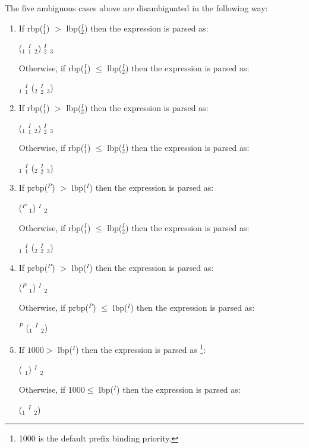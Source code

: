The five ambiguous cases above are disambiguated in the following way:

\begin{enumerate}

\item If rbp({\funsym}$^I_1$) $>$ lbp({\funsym}$^I_2$)
then the expression is parsed as:

({\term}$_1$ {\funsym}$^I_1$ {\term}$_2$) {\funsym}$^I_2$ {\term}$_3$

Otherwise, if
rbp({\funsym}$^I_1$) $\leq$ lbp({\funsym}$^I_2$)
then the expression is parsed as:

{\term}$_1$ {\funsym}$^I_1$ ({\term}$_2$ {\funsym}$^I_2$ {\term}$_3$)

\item If rbp({\sentconn}$^I_1$) $>$ lbp({\sentconn}$^I_2$)
then the expression is parsed as:

({\wff}$_1$ {\sentconn}$^I_1$ {\wff}$_2$) {\sentconn}$^I_2$ {\wff}$_3$

Otherwise, if
rbp({\sentconn}$^I_1$) $\leq$ lbp({\sentconn}$^I_2$)
then the expression is parsed as:

{\wff}$_1$ {\sentconn}$^I_1$ ({\wff}$_2$ {\sentconn}$^I_2$ {\wff}$_3$)

\item If prbp({\funsym}$^P$) $>$ lbp({\funsym}$^I$)
then the expression is parsed as:

({\funsym}$^P$ {\term}$_1$) {\funsym}$^I$ {\term}$_2$

Otherwise, if
rbp({\sentconn}$^I_1$) $\leq$ lbp({\sentconn}$^I_2$)
then the expression is parsed as:

{\wff}$_1$ {\sentconn}$^I_1$ ({\wff}$_2$ {\sentconn}$^I_2$ {\wff}$_3$)

\item If prbp({\sentconn}$^P$) $>$ lbp({\sentconn}$^I$)
then the expression is parsed as:

({\sentconn}$^P$ {\wff}$_1$) {\sentconn}$^I$ {\wff}$_2$

Otherwise, if
prbp({\sentconn}$^P$) $\leq$ lbp({\sentconn}$^I$)
then the expression is parsed as:

{\sentconn}$^P$ ({\wff}$_1$ {\sentconn}$^I$ {\wff}$_2$)

\item If $1000 >$ lbp({\sentconn}$^I$)
then the expression is parsed
as \footnote{1000 is the default prefix binding
priority.}:

({\quantprefix} {\wff}$_1$) {\sentconn}$^I$ {\wff}$_2$

Otherwise, if
$1000 \leq$ lbp({\sentconn}$^I$)
then the expression is parsed as:

{\quantprefix}  ({\wff}$_1$ {\sentconn}$^I$ {\wff}$_2$)

\end{enumerate}


